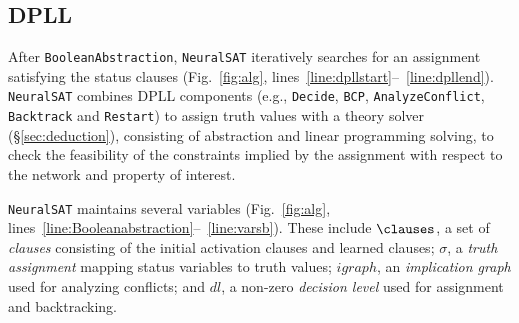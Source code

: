 \documentclass[oneside,11pt,dvipsnames]{book}
\numberwithin{equation}{section}
\theoremstyle{definition}
\theoremstyle{remark}
\newcommand{\tvn}[1]{\iftoggle{usecomment}{{\color{red}{[TVN]: #1}}}{}}
\newcommand{\hd}[1]{\iftoggle{usecomment}{{\color{blue}{[HD]: #1}}}{}}
\newcommand{\tool}{\texttt{NeuralSAT}}
\begin{document}



\subsection{DPLL}\label{sec:dpll}

After \texttt{BooleanAbstraction}, \tool{} iteratively searches for an assignment satisfying the status clauses (Fig.~\ref{fig:alg}, lines~\ref{line:dpllstart}--~\ref{line:dpllend}).
\tool{} combines  DPLL components (e.g., \texttt{Decide}, \texttt{BCP}, \texttt{AnalyzeConflict}, \texttt{Backtrack} and \texttt{Restart}) to assign truth values with a theory solver (\S\ref{sec:deduction}), consisting of abstraction and linear programming solving, to check the feasibility of the constraints implied by the assignment with respect to the network and property of interest.

\tool{} maintains several variables (Fig.~\ref{fig:alg}, lines~\ref{line:Booleanabstraction}--~\ref{line:varsb}). These include $\clauses$, a set of \emph{clauses} consisting of the initial activation clauses and learned clauses;   $\sigma$, a \emph{truth assignment} mapping status variables to truth values; $igraph$, an \emph{implication graph} used for analyzing conflicts; and  $dl$, a non-zero \emph{decision level} used for assignment and backtracking.



\end{document}
